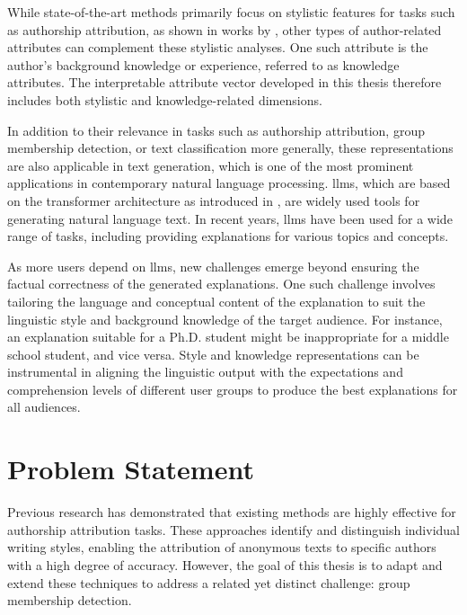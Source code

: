 While state-of-the-art methods primarily focus on stylistic features for tasks such as authorship attribution, as shown in works by \citet{alshomaryLatentSpaceInterpretation2024, patelLearningInterpretableStyle2023, konenStyleVectorsSteering2024, zhu-etal-2024-styleflow}, other types of author-related attributes can complement these stylistic analyses. One such attribute is the author's background knowledge or experience, referred to as knowledge attributes. The interpretable attribute vector developed in this thesis therefore includes both stylistic and knowledge-related dimensions.

In addition to their relevance in tasks such as authorship attribution, group membership detection, or text classification more generally, these representations are also applicable in text generation, which is one of the most prominent applications in contemporary natural language processing. \Acp{llm}, which are based on the transformer architecture as introduced in \cite{NIPS2017_3f5ee243}, are widely used tools for generating natural language text. In recent years, \acp{llm} have been used for a wide range of tasks, including providing explanations for various topics and concepts.

As more users depend on \acp{llm}, new challenges emerge beyond ensuring the factual correctness of the generated explanations. One such challenge involves tailoring the language and conceptual content of the explanation to suit the linguistic style and background knowledge of the target audience. For instance, an explanation suitable for a Ph.D. student might be inappropriate for a middle school student, and vice versa. Style and knowledge representations can be instrumental in aligning the linguistic output with the expectations and comprehension levels of different user groups to produce the best explanations for all audiences.


\section{Problem Statement}
\label{sec:introduction:problemStatement}

Previous research has demonstrated that existing methods are highly effective for authorship attribution tasks. These approaches identify and distinguish individual writing styles, enabling the attribution of anonymous texts to specific authors with a high degree of accuracy. However, the goal of this thesis is to adapt and extend these techniques to address a related yet distinct challenge: group membership detection.

